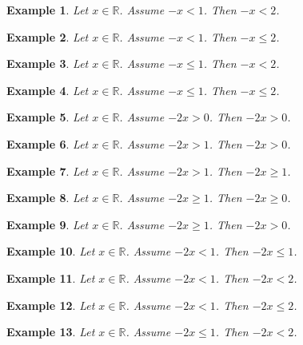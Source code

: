 \documentclass{article}
\newtheorem{example}{Example}
\begin{document}
\begin{example}
Let $x\in\mathbb{R}$. Assume $-x<1$. Then $-x<2$.
\end{example}

\begin{example}
Let $x\in\mathbb{R}$. Assume $-x<1$. Then $-x\le 2$.
\end{example}

\begin{example}
Let $x\in\mathbb{R}$. Assume $-x\le 1$. Then $-x<2$.
\end{example}

\begin{example}
Let $x\in\mathbb{R}$. Assume $-x\le 1$. Then $-x\le 2$.
\end{example}


\begin{example}
Let $x\in\mathbb{R}$. Assume $-2x>0$. Then $-2x>0$.
\end{example}

\begin{example}
Let $x\in\mathbb{R}$. Assume $-2x>1$. Then $-2x>0$.
\end{example}

\begin{example}
Let $x\in\mathbb{R}$. Assume $-2x>1$. Then $-2x\ge 1$.
\end{example}

\begin{example}
Let $x\in\mathbb{R}$. Assume $-2x\ge 1$. Then $-2x\ge 0$.
\end{example}

\begin{example}
Let $x\in\mathbb{R}$. Assume $-2x\ge 1$. Then $-2x> 0$.
\end{example}

\begin{example}
Let $x\in\mathbb{R}$. Assume $-2x<1$. Then $-2x\le 1$.
\end{example}

\begin{example}
Let $x\in\mathbb{R}$. Assume $-2x<1$. Then $-2x<2$.
\end{example}

\begin{example}
Let $x\in\mathbb{R}$. Assume $-2x<1$. Then $-2x\le 2$.
\end{example}

\begin{example}
Let $x\in\mathbb{R}$. Assume $-2x\le 1$. Then $-2x<2$.
\end{example}
\end{document}
